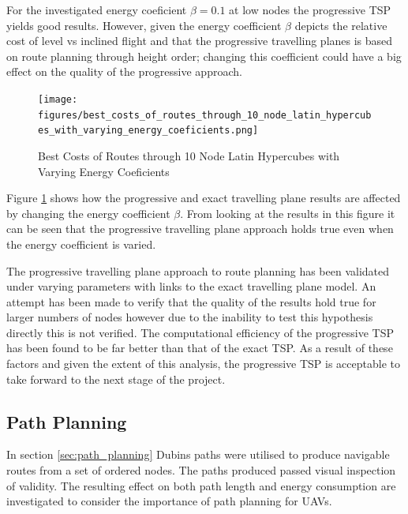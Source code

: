 \documentclass[a4paper,12pt,twoside]{article}
\begin{document}
For the investigated energy coeficient $\beta = 0.1$ at low nodes the progressive TSP yields good results. However, given the energy coefficient $\beta$ depicts the relative cost of level vs inclined flight and that the progressive travelling planes is based on route planning through height order; changing this coefficient could have a big effect on the quality of the progressive approach.

\begin{figure}
\centering
\texttt{[image: figures/best\_costs\_of\_routes\_through\_10\_node\_latin\_hypercubes\_with\_varying\_energy\_coeficients.png]} 
\caption{Best Costs of Routes through 10 Node Latin Hypercubes with Varying Energy Coeficients}
\label{fig:best_costs_of_routes_through_10_node_latin_hypercubes_with_varying_energy_coeficients}
\end{figure}

Figure \ref{fig:best_costs_of_routes_through_10_node_latin_hypercubes_with_varying_energy_coeficients} shows how the progressive and exact travelling plane results are affected by changing the energy coefficient $\beta$. From looking at the results in this figure it can be seen that the progressive travelling plane approach holds true even when the energy coefficient is varied.

The progressive travelling plane approach to route planning has been validated under varying parameters with links to the exact travelling plane model. An attempt has been made to verify that the quality of the results hold true for larger numbers of nodes however due to the inability to test this hypothesis directly this is not verified. The computational efficiency of the progressive TSP has been found to be far better than that of the exact TSP. As a result of these factors and given the extent of this analysis, the progressive TSP is acceptable to take forward to the next stage of the project.

\subsection{Path Planning}
\label{sec:path_planning_0}

In section \ref{sec:path_planning} Dubins paths were utilised to produce navigable routes from a set of ordered nodes. The paths produced passed visual inspection of validity. The resulting effect on both path length and energy consumption are investigated to consider the importance of path planning for UAVs.
\end{document}
